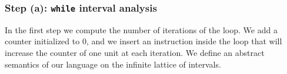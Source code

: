 \documentclass{llncs}
\newcommand{\notegian}[1]{\textbf{(NOTE: #1)}}
\begin{document}
\subsubsection{Step (a): \texttt{while} interval analysis} In the first step we compute the number of iterations of the loop. We add a counter initialized to $0$, and we insert an instruction inside the loop that will increase the counter of one unit at each iteration. We define an abstract semantics of our language on the infinite lattice of intervals. 
\\
\end{document}
